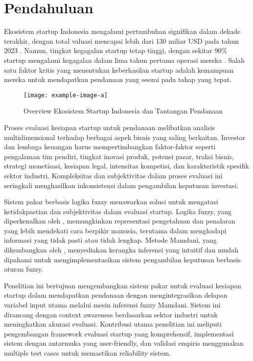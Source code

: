 \documentclass[12pt,a4paper]{article}
\begin{document}
\newpage

\section{Pendahuluan}

Ekosistem startup Indonesia mengalami pertumbuhan signifikan dalam dekade terakhir, dengan total valuasi mencapai lebih dari 130 miliar USD pada tahun 2023 \citep{Sartika2023}. Namun, tingkat kegagalan startup tetap tinggi, dengan sekitar 90\% startup mengalami kegagalan dalam lima tahun pertama operasi mereka \citep{Rahman2022}. Salah satu faktor kritis yang menentukan keberhasilan startup adalah kemampuan mereka untuk mendapatkan pendanaan yang sesuai pada tahap yang tepat.

\begin{figure}[htbp] %
    \centering
    \texttt{[image: example-image-a]} %
    \caption{Overview Ekosistem Startup Indonesia dan Tantangan Pendanaan}
    \label{fig:ecosystem}
\end{figure}

Proses evaluasi kesiapan startup untuk pendanaan melibatkan analisis multidimensional terhadap berbagai aspek bisnis yang saling berkaitan. Investor dan lembaga keuangan harus mempertimbangkan faktor-faktor seperti pengalaman tim pendiri, tingkat inovasi produk, potensi pasar, traksi bisnis, strategi monetisasi, kesiapan legal, intensitas kompetisi, dan karakteristik spesifik sektor industri. Kompleksitas dan subjektivitas dalam proses evaluasi ini seringkali menghasilkan inkonsistensi dalam pengambilan keputusan investasi.

Sistem pakar berbasis logika fuzzy menawarkan solusi untuk mengatasi ketidakpastian dan subjektivitas dalam evaluasi startup. Logika fuzzy, yang diperkenalkan oleh \citet{Zadeh1965}, memungkinkan representasi pengetahuan dan penalaran yang lebih mendekati cara berpikir manusia, terutama dalam menghadapi informasi yang tidak pasti atau tidak lengkap. Metode Mamdani, yang dikembangkan oleh \citet{Mamdani1975}, menyediakan kerangka inferensi yang intuitif dan mudah dipahami untuk mengimplementasikan sistem pengambilan keputusan berbasis aturan fuzzy.

Penelitian ini bertujuan mengembangkan sistem pakar untuk evaluasi kesiapan startup dalam mendapatkan pendanaan dengan mengintegrasikan delapan variabel input utama melalui mesin inferensi fuzzy Mamdani. Sistem ini dirancang dengan context awareness berdasarkan sektor industri untuk meningkatkan akurasi evaluasi. Kontribusi utama penelitian ini meliputi pengembangan framework evaluasi startup yang komprehensif, implementasi sistem dengan antarmuka yang user-friendly, dan validasi empiris menggunakan multiple test cases untuk memastikan reliability sistem.
\end{document}
